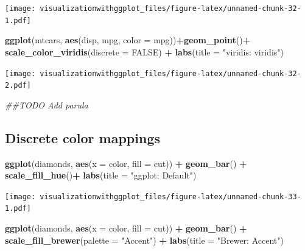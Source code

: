 \documentclass[]{krantz}
\makeatletter
\newenvironment{Shaded}{\begin{snugshade}}{\end{snugshade}}
\newcommand{\CommentTok}[1]{\textcolor[rgb]{0.56,0.35,0.01}{\textit{#1}}}
\newcommand{\DataTypeTok}[1]{\textcolor[rgb]{0.13,0.29,0.53}{#1}}
\newcommand{\KeywordTok}[1]{\textcolor[rgb]{0.13,0.29,0.53}{\textbf{#1}}}
\newcommand{\NormalTok}[1]{#1}
\newcommand{\OperatorTok}[1]{\textcolor[rgb]{0.81,0.36,0.00}{\textbf{#1}}}
\newcommand{\OtherTok}[1]{\textcolor[rgb]{0.56,0.35,0.01}{#1}}
\newcommand{\StringTok}[1]{\textcolor[rgb]{0.31,0.60,0.02}{#1}}
\newenvironment{kframe}{%
\medskip{}
\setlength{\fboxsep}{.8em}
 \def\at@end@of@kframe{}%
 \ifinner\ifhmode%
  \def\at@end@of@kframe{\end{minipage}}%
  \begin{minipage}{\columnwidth}%
 \fi\fi%
 \def\FrameCommand##1{\hskip\@totalleftmargin \hskip-\fboxsep
 \colorbox{shadecolor}{##1}\hskip-\fboxsep
     \hskip-\linewidth \hskip-\@totalleftmargin \hskip\columnwidth}%
 \MakeFramed {\advance\hsize-\width
   \@totalleftmargin\z@ \linewidth\hsize
   \@setminipage}}%
 {\par\unskip\endMakeFramed%
 \at@end@of@kframe}
\renewenvironment{Shaded}{\begin{kframe}}{\end{kframe}}
\makeatother
\begin{document}
\texttt{[image: visualizationwithggplot\_files/figure-latex/unnamed-chunk-32-1.pdf]}

\begin{Shaded}
\begin{Highlighting}[]
\KeywordTok{ggplot}\NormalTok{(mtcars, }\KeywordTok{aes}\NormalTok{(disp,  mpg, }\DataTypeTok{color =}\NormalTok{ mpg))}\OperatorTok{+}\KeywordTok{geom_point}\NormalTok{()}\OperatorTok{+}\StringTok{ }
\StringTok{  }\KeywordTok{scale_color_viridis}\NormalTok{(}\DataTypeTok{discrete =} \OtherTok{FALSE}\NormalTok{) }\OperatorTok{+}
\StringTok{  }\KeywordTok{labs}\NormalTok{(}\DataTypeTok{title =} \StringTok{"viridis: viridis"}\NormalTok{)}
\end{Highlighting}
\end{Shaded}

\texttt{[image: visualizationwithggplot\_files/figure-latex/unnamed-chunk-32-2.pdf]}

\begin{Shaded}
\begin{Highlighting}[]
\CommentTok{##TODO Add parula}
\end{Highlighting}
\end{Shaded}

\hypertarget{discrete-color-mappings}{%
\subsection{Discrete color mappings}\label{discrete-color-mappings}}

\begin{Shaded}
\begin{Highlighting}[]
\KeywordTok{ggplot}\NormalTok{(diamonds, }\KeywordTok{aes}\NormalTok{(}\DataTypeTok{x =}\NormalTok{ color, }\DataTypeTok{fill =}\NormalTok{ cut)) }\OperatorTok{+}\StringTok{ }
\StringTok{    }\KeywordTok{geom_bar}\NormalTok{() }\OperatorTok{+}
\StringTok{  }\KeywordTok{scale_fill_hue}\NormalTok{()}\OperatorTok{+}\StringTok{ }
\StringTok{  }\KeywordTok{labs}\NormalTok{(}\DataTypeTok{title =} \StringTok{"ggplot: Default"}\NormalTok{)}
\end{Highlighting}
\end{Shaded}

\texttt{[image: visualizationwithggplot\_files/figure-latex/unnamed-chunk-33-1.pdf]}

\begin{Shaded}
\begin{Highlighting}[]
\KeywordTok{ggplot}\NormalTok{(diamonds, }\KeywordTok{aes}\NormalTok{(}\DataTypeTok{x =}\NormalTok{ color, }\DataTypeTok{fill =}\NormalTok{ cut)) }\OperatorTok{+}\StringTok{  }\KeywordTok{geom_bar}\NormalTok{() }\OperatorTok{+}\StringTok{ }
\StringTok{  }\KeywordTok{scale_fill_brewer}\NormalTok{(}\DataTypeTok{palette =} \StringTok{"Accent"}\NormalTok{) }\OperatorTok{+}\StringTok{ }
\StringTok{  }\KeywordTok{labs}\NormalTok{(}\DataTypeTok{title =} \StringTok{"Brewer: Accent"}\NormalTok{)}
\end{Highlighting}
\end{Shaded}
\end{document}
